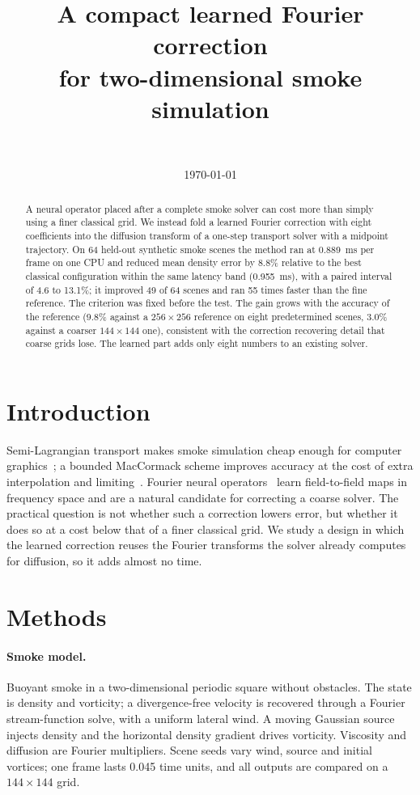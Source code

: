 \documentclass[11pt]{article}
\title{A compact learned Fourier correction\\ for two-dimensional smoke simulation}
\author{\authorname\\ \small \affiliation}
\date{\today}
\begin{document}
\maketitle

\begin{abstract}
A neural operator placed after a complete smoke solver can cost more than simply using a finer classical grid. We
instead fold a learned Fourier correction with eight coefficients into the diffusion transform of a one-step
transport solver with a midpoint trajectory. On 64 held-out synthetic smoke scenes the method ran at 0.889~ms per
frame on one CPU and reduced mean density error by 8.8\% relative to the best classical configuration within the same
latency band (0.955~ms), with a paired interval of 4.6 to 13.1\%; it improved 49 of 64 scenes and ran 55 times faster
than the fine reference. The criterion was fixed before the test. The gain grows with the accuracy of the reference
(9.8\% against a $256\times256$ reference on eight predetermined scenes, 3.0\% against a coarser $144\times144$ one),
consistent with the correction recovering detail that coarse grids lose. The learned part adds only eight numbers to
an existing solver.
\end{abstract}

\section{Introduction}
Semi-Lagrangian transport makes smoke simulation cheap enough for computer graphics~\cite{stam}; a bounded MacCormack
scheme improves accuracy at the cost of extra interpolation and limiting~\cite{selle}. Fourier neural
operators~\cite{li} learn field-to-field maps in frequency space and are a natural candidate for correcting a coarse
solver. The practical question is not whether such a correction lowers error, but whether it does so at a cost
below that of a finer classical grid. We study a design in which the learned correction reuses the Fourier
transforms the solver already computes for diffusion, so it adds almost no time.

\section{Methods}
\paragraph{Smoke model.} Buoyant smoke in a two-dimensional periodic square without obstacles. The state is density
and vorticity; a divergence-free velocity is recovered through a Fourier stream-function solve, with a uniform lateral
wind. A moving Gaussian source injects density and the horizontal density gradient drives vorticity. Viscosity and
diffusion are Fourier multipliers. Scene seeds vary wind, source and initial vortices; one frame lasts 0.045 time
units, and all outputs are compared on a $144\times144$ grid.
\end{document}
